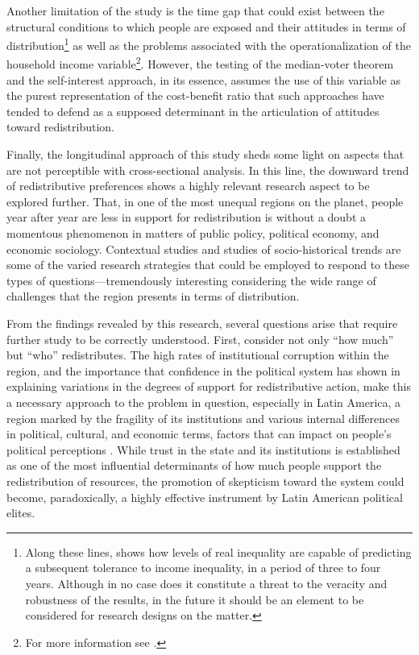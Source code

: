 \documentclass[utf8]{frontiersSCNS} %
\begin{document}
Another limitation of the study is the time gap that could exist between the structural conditions to which people are exposed and their attitudes in terms of distribution\footnote{Along these lines, \textcite{SchroderIncomeInequalityRelated2017} shows how levels of real inequality are capable of predicting a subsequent tolerance to income inequality, in a period of three to four years. Although in no case does it constitute a threat to the veracity and robustness of the results, in the future it should be an element to be considered for research designs on the matter.}  as well as the problems associated with the operationalization of the household income variable\footnote{For more information see \textcite{FeresNotassobremedicion1997}.}. However, the testing of the median-voter theorem and the self-interest approach, in its essence, assumes the use of this variable as the purest representation of the cost-benefit ratio that such approaches have tended to defend as a supposed determinant in the articulation of attitudes toward redistribution.

Finally, the longitudinal approach of this study sheds some light on aspects that are not perceptible with cross-sectional analysis. In this line, the downward trend of redistributive preferences shows a highly relevant research aspect to be explored further. That, in one of the most unequal regions on the planet, people year after year are less in support for redistribution is without a doubt a momentous phenomenon in matters of public policy, political economy, and economic sociology. Contextual studies and studies of socio-historical trends are some of the varied research strategies that could be employed to respond to these types of questions—tremendously interesting considering the wide range of challenges that the region presents in terms of distribution.

From the findings revealed by this research, several questions arise that require further study to be correctly understood. First, consider not only “how much” but “who” redistributes. The high rates of institutional corruption within the region, and the importance that confidence in the political system has shown in explaining variations in the degrees of support for redistributive action, make this a necessary approach to the problem in question, especially in Latin America, a region marked by the fragility of its institutions \parencite{portes2010institutions} and various internal differences in political, cultural, and economic terms, factors that can impact on people’s political perceptions \parencite{Stevens2016}. While trust in the state and its institutions is established as one of the most influential determinants of how much people support the redistribution of resources, the promotion of skepticism toward the system could become, paradoxically, a highly effective instrument by Latin American political elites.
\end{document}

